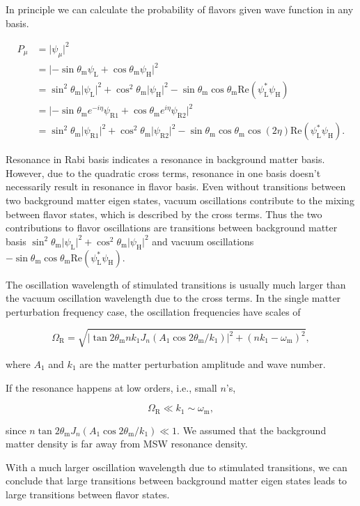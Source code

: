 \documentclass[%
preprint,
 amsmath,amssymb,
 prd,
]{revtex4-1}
\begin{document}
In principle we can calculate the probability of flavors given wave function in any basis.

\begin{align}
    P_\mu &= \lvert \psi_\mu \rvert^2 \\
    & = \lvert -\sin\theta_{\mathrm m} \psi_{\mathrm L} + \cos \theta_{\mathrm m} \psi_{\mathrm H} \rvert^2 \\
    &= \sin^2\theta_{\mathrm m} \lvert\psi_{\mathrm L} \rvert^2 + \cos^2\theta_{\mathrm m} \lvert \psi_{\mathrm H} \rvert^2 - \sin \theta_{\mathrm m}\cos\theta_{\mathrm m} \mathrm{Re}(\psi_{\mathrm L}^* \psi_{\mathrm H})\\
    &= \lvert -\sin\theta_{\mathrm m} e^{-i\eta} \psi_{\mathrm R1} + \cos\theta_{\mathrm m} e^{i\eta} \psi_{\mathrm R2}  \rvert^2 \\
    &= \sin^2\theta_{\mathrm m} \lvert\psi_{\mathrm R1} \rvert^2 + \cos^2\theta_{\mathrm m} \lvert \psi_{\mathrm R2} \rvert^2 - \sin \theta_{\mathrm m}\cos\theta_{\mathrm m} \mathrm \cos(2\eta) \mathrm{Re}(\psi_{\mathrm L}^* \psi_{\mathrm H}).
\end{align}

Resonance in Rabi basis indicates a resonance in background matter basis. However, due to the quadratic cross terms, resonance in one basis doesn't necessarily result in resonance in flavor basis. Even without transitions between two background matter eigen states, vacuum oscillations contribute to the mixing between flavor states, which is described by the cross terms. Thus the two contributions to flavor oscillations are transitions between background matter basis $\sin^2\theta_{\mathrm m} \lvert\psi_{\mathrm L} \rvert^2 + \cos^2\theta_{\mathrm m} \lvert \psi_{\mathrm H} \rvert^2 $ and vacuum oscillations $- \sin \theta_{\mathrm m}\cos\theta_{\mathrm m} \mathrm{Re}(\psi_{\mathrm L}^* \psi_{\mathrm H})$.

The oscillation wavelength of stimulated transitions is usually much larger than the vacuum oscillation wavelength due to the cross terms. In the single matter perturbation frequency case, the oscillation frequencies have scales of


\begin{equation}
    \Omega_{\mathrm R} = \sqrt{ \lvert \tan 2\theta_{\mathrm m}  n  k_1 J_n\left (A_1\cos 2\theta_{\mathrm m}/k_1\right) \rvert^2 + (n k_1 -\omega_{\mathrm m})^2 } ,
\end{equation}

where $A_1$ and $k_1$ are the matter perturbation amplitude and wave number.

If the resonance happens at low orders, i.e., small $n$'s,

\begin{equation}
    \Omega_{\mathrm R} \ll k_1 \sim \omega_{\mathrm m},
\end{equation}

since $n \tan 2\theta_{\mathrm m} J_n(A_1\cos 2\theta_{\mathrm m}/k_1)\ll 1$. We assumed that the background matter density is far away from MSW resonance density.

With a much larger oscillation wavelength due to stimulated transitions, we can conclude that large transitions between background matter eigen states leads to large transitions between flavor states.
\end{document}
